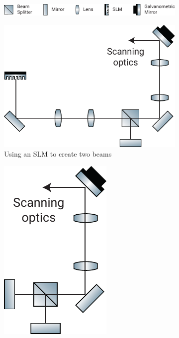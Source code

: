 \begin{figure}
\centering
    \begin{subfigure}[t]{\textwidth}
        \centering
         \includegraphics{dual_beam_layout/key}
    \end{subfigure}
    \begin{subfigure}[t]{0.6\textwidth}
        \centering
         \includegraphics{dual_beam_layout/slm}
         \caption{Using an \gls{SLM} to create two beams}\label{fig:dual_beam_layout/slm}
    \end{subfigure}
    \hspace{\fill}
    \begin{subfigure}[t]{0.3\textwidth}
        \centering
         \includegraphics{dual_beam_layout/beamsplitter}

\end{subfigure}
\end{figure}
